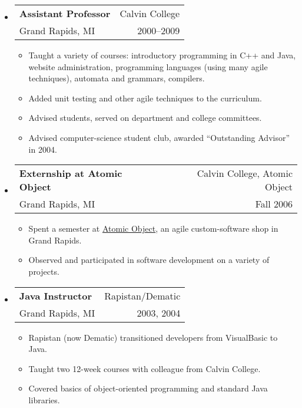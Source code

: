 \documentclass[letterpaper,10pt]{article}
\makeatletter
\newcommand{\resitem}[1]{\vspace{-2pt} \item #1}
\newcommand{\ressubheading}[4]{ 
\begin{tabular*}{7in}{l@{\extracolsep{\fill}}r}
	\textbf{#1} & #2 \\
	{#3} & {#4} \\
\end{tabular*}
\vspace{-6pt}}
\makeatother
\begin{document}
\begin{itemize}
	\item \ressubheading{Assistant Professor}{Calvin College}{Grand Rapids, MI}{2000--2009} 
    \vspace{-1mm}
	  \begin{itemize}
		\resitem{Taught a variety of courses: introductory programming in C++ and Java, website administration, programming languages (using many agile techniques), automata and grammars, compilers.}
		\resitem{Added unit testing and other agile techniques to the curriculum.}
	  \vspace{-1mm}
		\resitem{Advised students, served on department and college committees.}
		\resitem{Advised computer-science student club, awarded ``Outstanding Advisor'' in 2004.}
	\end{itemize}
	
	\item \ressubheading{Externship at Atomic Object}{Calvin College, Atomic Object}{Grand Rapids, MI}{Fall 2006}
  \vspace{-1mm}
	  \begin{itemize}
	   \resitem{Spent a semester at \href{http://www.atomicobject.com}{Atomic Object}, an agile custom-software shop in Grand Rapids.}
	   \resitem{Observed and participated in software development on a variety of projects.}
	  \end{itemize}
	
	\item \ressubheading{Java Instructor}{Rapistan/Dematic}{Grand Rapids, MI}{2003, 2004}
  \vspace{-1mm}
	\begin{itemize}
	  \vspace{-1mm}
	  \resitem{Rapistan (now Dematic) transitioned developers from VisualBasic to Java.}
		\resitem{Taught two 12-week courses with colleague from Calvin College.}
		\resitem{Covered basics of object-oriented programming and standard Java libraries.}
	\end{itemize}
	

\end{itemize}
\end{document}
